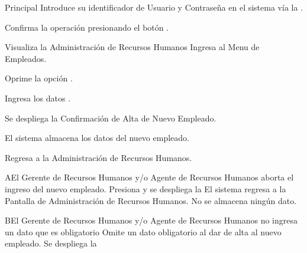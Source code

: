 \begin{UCtrayectoria}{Principal}
\UCpaso[\UCactor] Introduce su identificador de Usuario y Contraseña en el sistema vía la  \label{CU17Login}.

\UCpaso[\UCactor] Confirma la operación presionando el botón .

\UCpaso Visualiza la  Administración de Recursos Humanos
\UCpaso[\UCactor] Ingresa al Menu de Empleados.

\UCpaso[\UCactor] Oprime la opción .

\UCpaso[\UCactor] Ingresa los datos .

\UCpaso Se despliega la  Confirmación de Alta de Nuevo Empleado.

\UCpaso El sistema almacena los datos del nuevo empleado.

\UCpaso [\UCactor] Regresa a la  Administración de Recursos Humanos.


\end{UCtrayectoria}

\begin{UCtrayectoriaA}{A}{El Gerente de Recursos Humanos y/o Agente de Recursos Humanos aborta el ingreso del nuevo empleado.}
\UCpaso [\UCactor] Presiona  y se despliega la 
\UCpaso El sistema regresa a la Pantalla de Administración de Recursos Humanos. No se almacena ningún dato.
\end{UCtrayectoriaA}

\begin{UCtrayectoriaA}{B}{El Gerente de Recursos Humanos y/o Agente de Recursos Humanos no ingresa un dato que es obligatorio}
\UCpaso [\UCactor] Omite un dato obligatorio al dar de alta al nuevo empleado.
\UCpaso Se despliega la 
\end{UCtrayectoriaA}



